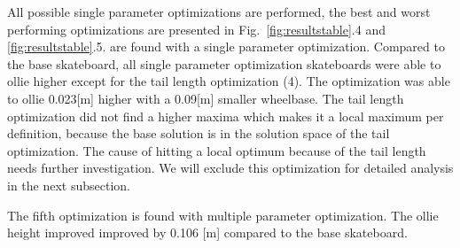 \documentclass[default,iicol]{sn-jnl}
\begin{document}
All possible single parameter optimizations are performed, the best and worst performing optimizations are presented in Fig.~\ref{fig:resultstable}.4 and \ref{fig:resultstable}.5. are found with a single parameter optimization. Compared to the base skateboard, all single parameter optimization skateboards were able to ollie higher except for the tail length optimization (4). The optimization was able to ollie 0.023[m] higher with a 0.09[m] smaller wheelbase. The tail length optimization did not find a higher maxima which makes it a local maximum per definition, because the base solution is in the solution space of the tail optimization. The cause of hitting a local optimum because of the tail length needs further investigation. We will exclude this optimization for detailed analysis in the next subsection.

The fifth optimization is found with multiple parameter optimization. The ollie height improved improved by 0.106 [m] compared to the base skateboard. 

\end{document}
